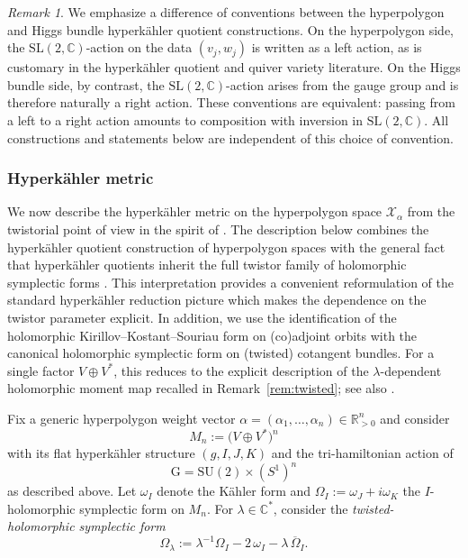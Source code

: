\documentclass[12pt,a4paper]{amsart}
\theoremstyle{definition}
\theoremstyle{remark}
\newtheorem{remark}[theorem]{Remark}
\newcommand{\R}{\mathbb R}
\newcommand{\C}{\mathbb C}
\begin{document}
\begin{remark}\label{rem:left-right-convention}
We emphasize a difference of conventions between the hyperpolygon and Higgs bundle
hyperk\"ahler quotient constructions.
On the hyperpolygon side, the $\mathrm{SL}(2,\C)$-action on the data $(v_j,w_j)$ is
written as a left action, as is customary in the hyperk\"ahler quotient and quiver
variety literature.
On the Higgs bundle side, by contrast, the $\mathrm{SL}(2,\C)$-action arises from the
gauge group and is therefore naturally a right action.
These conventions are equivalent: passing from a left to a right action amounts to
composition with inversion in $\mathrm{SL}(2,\C)$.
All constructions and statements below are independent of this choice of convention.
\end{remark}


\subsubsection*{Hyperk\"ahler metric}

We now describe the hyperk\"ahler metric on the hyperpolygon space
$\mathcal X_\alpha$ from the twistorial point of view in the spirit of 
\cite{Biquard98}. The description below combines the hyperk\"ahler quotient
construction of hyperpolygon spaces \cite{Konno2} with the general fact that
hyperk\"ahler quotients inherit the full twistor family of holomorphic symplectic
forms \cite{HKLR}. This interpretation provides a convenient
reformulation of the standard hyperk\"ahler reduction picture which makes the
dependence on the twistor parameter explicit.
In addition, we use the identification of the holomorphic
Kirillov--Kostant--Souriau form on (co)adjoint orbits with the canonical
holomorphic symplectic form on (twisted) cotangent bundles.
For a single factor $V\oplus V^*$, this reduces to the explicit description of the
$\lambda$-dependent holomorphic moment map recalled in
Remark~\ref{rem:twisted}; see also \cite[Th\'eor\`eme~4]{Biquard98}.


Fix a generic hyperpolygon weight vector $\alpha=(\alpha_1,\dots,\alpha_n)\in\R_{>0}^n$ and
consider
\[
M_n:=\bigl(V \oplus V^*\bigr)^n\]
with its flat hyperk\"ahler structure $(g,I,J,K)$ and the tri-hamiltonian action of
\[
\mathrm{G}=\mathrm{SU}(2)\times (S^1)^n
\]
as described above.
Let $\omega_I$ denote the K\"ahler form and
$\Omega_I:=\omega_J+i\omega_K$ the $I$-holomorphic symplectic form on $M_n$.
For $\lambda\in\C^*$, consider the \emph{twisted-holomorphic symplectic form}
\[
\Omega_\lambda:=\lambda^{-1}\Omega_I-2\,\omega_I-\lambda\,\overline{\Omega}_I.
\]
\end{document}

